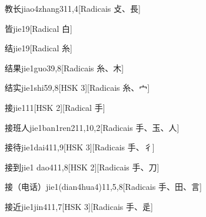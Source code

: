 \begin{entry}{教长}{jiao4zhang3}{11,4}[Radicais ⽁、⾧]
\end{entry}

\begin{entry}{皆}{jie1}{9}[Radical ⽩]
\end{entry}

\begin{entry}{结}{jie1}{9}[Radical ⽷]
\end{entry}

\begin{entry}{结果}{jie1guo3}{9,8}[Radicais ⽷、⽊]
\end{entry}

\begin{entry}{结实}{jie1shi5}{9,8}[HSK 3][Radicais ⽷、⼧]
\end{entry}

\begin{entry}{接}{jie1}{11}[HSK 2][Radical ⼿]
\end{entry}

\begin{entry}{接班人}{jie1ban1ren2}{11,10,2}[Radicais ⼿、⽟、⼈]
\end{entry}

\begin{entry}{接待}{jie1dai4}{11,9}[HSK 3][Radicais ⼿、⼻]
\end{entry}

\begin{entry}{接到}{jie1 dao4}{11,8}[HSK 2][Radicais ⼿、⼑]
\end{entry}

\begin{entry}{接（电话）}{jie1(dian4hua4)}{11,5,8}[Radicais ⼿、⽥、⾔]
\end{entry}

\begin{entry}{接近}{jie1jin4}{11,7}[HSK 3][Radicais ⼿、⾡]
\end{entry}

